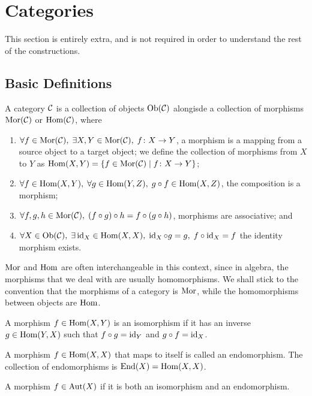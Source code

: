 \chapter{Categories}\label{sec:categories}

\begin{remark}
    This section is entirely extra,
    and is not required in order to understand the rest of the constructions.
\end{remark}

\section{Basic Definitions}

\begin{definition}
    A category \(\mathcal{C}\) is a collection of objects \(\operatorname{Ob}(\mathcal{C})\)
    alongisde a collection of morphisms \(\operatorname{Mor}(\mathcal{C})\) or \(\operatorname{Hom}(\mathcal{C})\),
    where
    \begin{enumerate}[label={(\roman*)}, itemsep=0mm]
        \item \(\forall f \in \operatorname{Mor}(\mathcal{C}),\; \exists X,Y \in \operatorname{Mor}(\mathcal{C}),\; f\colon X\to Y\),
            a morphism is a mapping from a source object to a target object;
            we define the collection of morphisms from \(X\) to \(Y\)
            as \(\operatorname{Hom}(X,Y) = \{f\in\operatorname{Mor}(\mathcal{C}) \mid f\colon X\to Y\}\);
        \item \(\forall f \in \operatorname{Hom}(X,Y),\; \forall g \in \operatorname{Hom}(Y,Z),\; g \circ f \in \operatorname{Hom}(X,Z)\),
            the composition is a morphism;
        \item \(\forall f,g,h \in \operatorname{Mor}(\mathcal{C}),\; (f \circ g) \circ h = f \circ (g \circ h)\),
            morphisms are associative; and
        \item \(\forall X \in \operatorname{Ob}(\mathcal{C}),\; \exists \operatorname{id}_X \in \operatorname{Hom}(X,X),\; \operatorname{id}_X \circ g = g,\; f \circ \operatorname{id}_X = f\)
            the identity morphism exists.
    \end{enumerate}
\end{definition}
\begin{remark}
    \(\operatorname{Mor}\) and \(\operatorname{Hom}\) are often interchangeable in this context,
    since in algebra, the morphisms that we deal with are usually homomorphisms.
    We shall stick to the convention that the morphisms of a category is \(\operatorname{Mor}\),
    while the homomorphisms between objects are \(\operatorname{Hom}\).
\end{remark}

\begin{definition}
    A morphism \(f \in \operatorname{Hom}(X,Y)\) is an isomorphism
    if it has an inverse \(g \in \operatorname{Hom}(Y,X)\)
    such that \(f \circ g = \operatorname{id}_Y\) and \(g \circ f = \operatorname{id}_X\).
\end{definition}
\begin{definition}
    A morphism \(f \in \operatorname{Hom}(X,X)\) that maps to itself is called an endomorphism.
    The collection of endomorphisms is \(\operatorname{End}(X) = \operatorname{Hom}(X,X)\).
\end{definition}
\begin{definition}
    A morphism \(f \in \operatorname{Aut}(X)\) if it is both an isomorphism and an endomorphism.
\end{definition}


